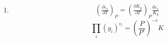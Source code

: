 \begin{solution}
  \begin{enumerate}[label=(\alph*)]
    \item
      \begin{gather*}
        \left(\frac{\partial \varepsilon_e}{\partial T}\right)_{P} =
        \left(\frac{\partial K_y}{\partial T}\right)_{P}
        \frac{d\varepsilon_e}{K_y}
      \end{gather*}
      \begin{equation}
        \prod_i (y_i)^{v_i} = \left(\frac{P}{P^\circ}\right)^{-v}K \tag{13.28}
      \end{equation}
  \end{enumerate}
\end{solution}
